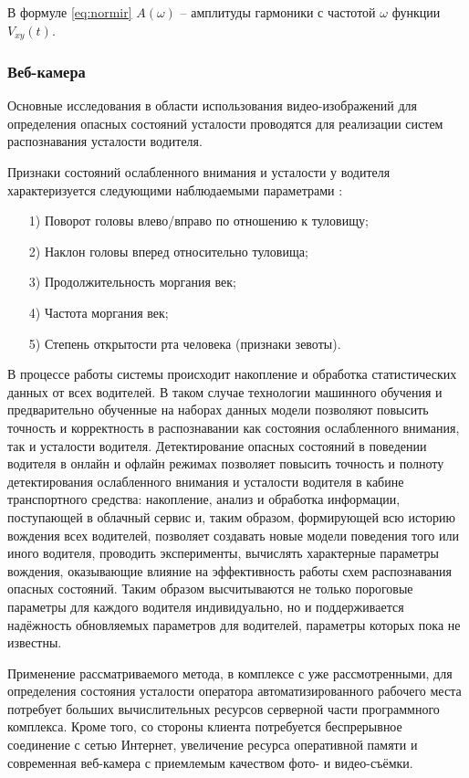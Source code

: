 В формуле \ref{eq:normir} $A(\omega)$ -- амплитуды гармоники с частотой $\omega$ функции $V_{xy}(t)$.

\subsubsection{Веб-камера}
Основные исследования в области использования видео-изображений для определения опасных состояний усталости проводятся для реализации систем распознавания усталости водителя.

Признаки состояний ослабленного внимания и усталости у водителя характеризуется следующими наблюдаемыми параметрами \cite{videoMethod}:
\begin{itemize}[leftmargin=1.6\parindent]
\item[1)] Поворот головы влево/вправо по отношению к туловищу;
\item[2)] Наклон головы вперед относительно туловища;
\item[3)] Продолжительность моргания век;
\item[4)] Частота моргания век;
\item[5)] Степень открытости рта человека (признаки зевоты).
\end{itemize}

В процессе работы системы происходит накопление и обработка статистических данных от всех водителей. В таком случае технологии машинного обучения и предварительно обученные на наборах данных модели позволяют повысить точность и корректность в распознавании как состояния ослабленного внимания, так и усталости водителя. Детектирование опасных состояний в поведении водителя в онлайн и офлайн режимах позволяет повысить точность и полноту детектирования ослабленного внимания и усталости водителя в кабине транспортного средства: накопление, анализ и обработка информации, поступающей в облачный сервис и, таким образом, формирующей всю историю вождения всех водителей, позволяет создавать новые модели поведения того или иного водителя, проводить эксперименты, вычислять характерные параметры вождения, оказывающие влияние на эффективность работы схем распознавания опасных состояний. Таким образом высчитываются не только пороговые параметры для каждого водителя индивидуально, но и поддерживается надёжность обновляемых параметров для водителей, параметры которых пока не известны. \cite{videoMethod}

Применение рассматриваемого метода, в комплексе с уже рассмотренными, для определения состояния усталости оператора автоматизированного рабочего места потребует больших вычислительных ресурсов серверной части программного комплекса. Кроме того, со стороны клиента потребуется беспрерывное соединение с сетью Интернет, увеличение ресурса оперативной памяти и современная веб-камера с приемлемым качеством фото- и видео-съёмки.

